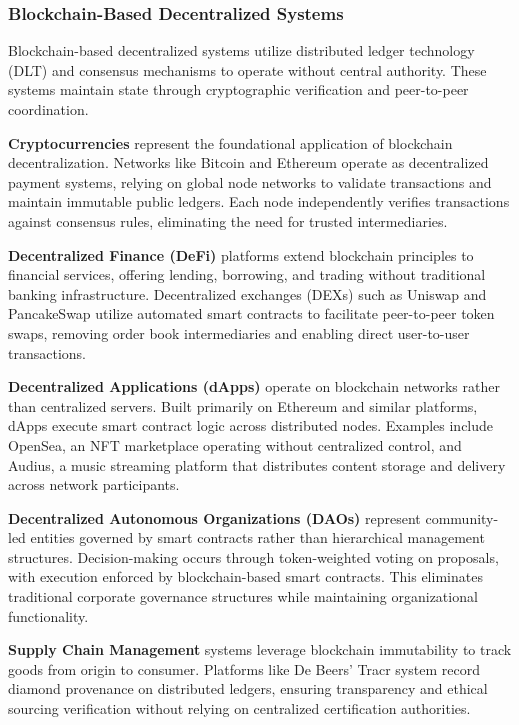 \subsubsection{Blockchain-Based Decentralized Systems}
\label{subsubsec:blockchain-decentralized}

Blockchain-based decentralized systems utilize distributed ledger technology (DLT) and consensus mechanisms to operate without central authority. These systems maintain state through cryptographic verification and peer-to-peer coordination.

\textbf{Cryptocurrencies} represent the foundational application of blockchain decentralization. Networks like Bitcoin and Ethereum operate as decentralized payment systems, relying on global node networks to validate transactions and maintain immutable public ledgers. Each node independently verifies transactions against consensus rules, eliminating the need for trusted intermediaries.

\textbf{Decentralized Finance (DeFi)} platforms extend blockchain principles to financial services, offering lending, borrowing, and trading without traditional banking infrastructure. Decentralized exchanges (DEXs) such as Uniswap and PancakeSwap utilize automated smart contracts to facilitate peer-to-peer token swaps, removing order book intermediaries and enabling direct user-to-user transactions.

\textbf{Decentralized Applications (dApps)} operate on blockchain networks rather than centralized servers. Built primarily on Ethereum and similar platforms, dApps execute smart contract logic across distributed nodes. Examples include OpenSea, an NFT marketplace operating without centralized control, and Audius, a music streaming platform that distributes content storage and delivery across network participants.

\textbf{Decentralized Autonomous Organizations (DAOs)} represent community-led entities governed by smart contracts rather than hierarchical management structures. Decision-making occurs through token-weighted voting on proposals, with execution enforced by blockchain-based smart contracts. This eliminates traditional corporate governance structures while maintaining organizational functionality.

\textbf{Supply Chain Management} systems leverage blockchain immutability to track goods from origin to consumer. Platforms like De Beers' Tracr system record diamond provenance on distributed ledgers, ensuring transparency and ethical sourcing verification without relying on centralized certification authorities.

